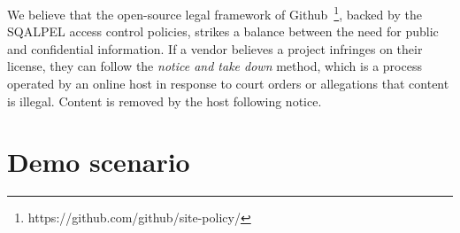 \documentclass{cidr-2019}
\begin{document}
We believe that the open-source legal framework of
Github~\footnote{https://github.com/github/site-policy/}, backed by
the {\sc SQALPEL} access control policies, strikes a balance between
the need for public and confidential information. If a vendor believes
a project infringes on their license, they can follow the \emph{notice
  and take down} method, which is a process operated by an online host
in response to court orders or allegations that content is
illegal. Content is removed by the host following notice.



\section{Demo scenario}\label{demo}

 
 
 
\end{document}
